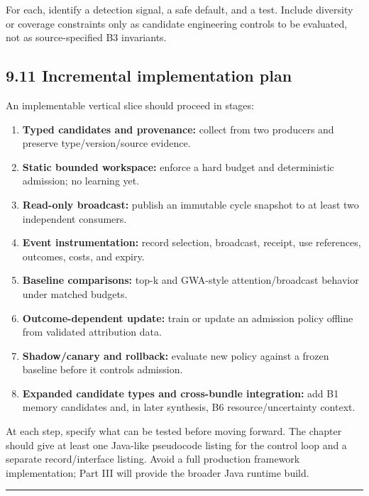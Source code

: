 For each, identify a detection signal, a safe default, and a test. Include diversity or coverage constraints only as candidate engineering controls to be evaluated, not as source-specified B3 invariants.

\subsection{9.11 Incremental implementation plan}\label{911-incremental-implementation-plan}

An implementable vertical slice should proceed in stages:

\begin{enumerate}
\def\labelenumi{\arabic{enumi}.}
\tightlist
\item
  \textbf{Typed candidates and provenance:} collect from two producers and preserve type/version/source evidence.
\item
  \textbf{Static bounded workspace:} enforce a hard budget and deterministic admission; no learning yet.
\item
  \textbf{Read-only broadcast:} publish an immutable cycle snapshot to at least two independent consumers.
\item
  \textbf{Event instrumentation:} record selection, broadcast, receipt, use references, outcomes, costs, and expiry.
\item
  \textbf{Baseline comparisons:} top-k and GWA-style attention/broadcast behavior under matched budgets.
\item
  \textbf{Outcome-dependent update:} train or update an admission policy offline from validated attribution data.
\item
  \textbf{Shadow/canary and rollback:} evaluate new policy against a frozen baseline before it controls admission.
\item
  \textbf{Expanded candidate types and cross-bundle integration:} add B1 memory candidates and, in later synthesis, B6 resource/uncertainty context.
\end{enumerate}

At each step, specify what can be tested before moving forward. The chapter should give at least one Java-like pseudocode listing for the control loop and a separate record/interface listing. Avoid a full production framework implementation; Part III will provide the broader Java runtime build.

\begin{center}\rule{0.5\linewidth}{0.5pt}\end{center}

